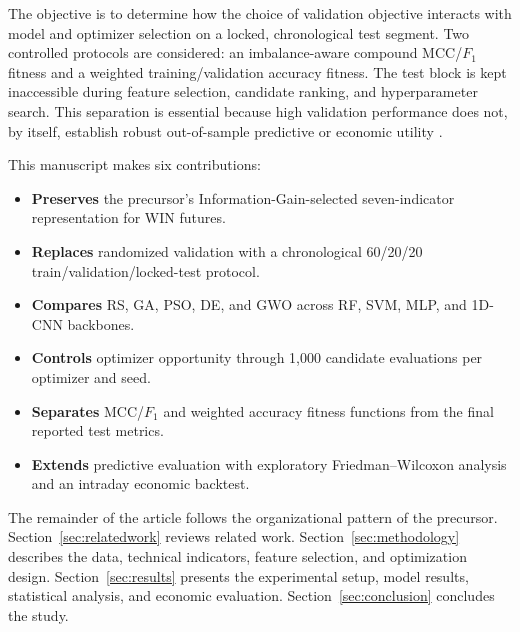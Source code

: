 The objective is to determine how the choice of validation objective interacts with model and optimizer selection on a locked, chronological test segment. Two controlled protocols are considered: an imbalance-aware compound MCC/$F_1$ fitness and a weighted training/validation accuracy fitness. The test block is kept inaccessible during feature selection, candidate ranking, and hyperparameter search. This separation is essential because high validation performance does not, by itself, establish robust out-of-sample predictive or economic utility \cite{chicco2020mcc,demsar2006statistical}.

This manuscript makes six contributions:
\begin{itemize}
    \item \textbf{Preserves} the precursor's Information-Gain-selected seven-indicator representation for WIN futures.
    \item \textbf{Replaces} randomized validation with a chronological 60/20/20 train/validation/locked-test protocol.
    \item \textbf{Compares} RS, GA, PSO, DE, and GWO across RF, SVM, MLP, and 1D-CNN backbones.
    \item \textbf{Controls} optimizer opportunity through 1,000 candidate evaluations per optimizer and seed.
    \item \textbf{Separates} MCC/$F_1$ and weighted accuracy fitness functions from the final reported test metrics.
    \item \textbf{Extends} predictive evaluation with exploratory Friedman--Wilcoxon analysis and an intraday economic backtest.
\end{itemize}

The remainder of the article follows the organizational pattern of the precursor. Section~\ref{sec:relatedwork} reviews related work. Section~\ref{sec:methodology} describes the data, technical indicators, feature selection, and optimization design. Section~\ref{sec:results} presents the experimental setup, model results, statistical analysis, and economic evaluation. Section~\ref{sec:conclusion} concludes the study.
